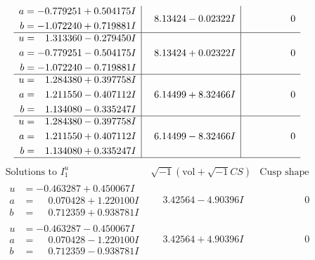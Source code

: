 \documentclass[1p]{elsarticle_modified}
\theoremstyle{definition}
\newcommand{\I}{\sqrt{-1}}
\begin{document}
$$\begin{array}{c|c|c}
\begin{aligned}
a &= -0.779251 + 0.504175 I \\
b &= -1.072240 + 0.719881 I\end{aligned}
 & \phantom{-}8.13424 - 0.02322 I & \phantom{-0.000000 } 0 \\ \hline\begin{aligned}
u &= \phantom{-}1.313360 - 0.279450 I \\
a &= -0.779251 - 0.504175 I \\
b &= -1.072240 - 0.719881 I\end{aligned}
 & \phantom{-}8.13424 + 0.02322 I & \phantom{-0.000000 } 0 \\ \hline\begin{aligned}
u &= \phantom{-}1.284380 + 0.397758 I \\
a &= \phantom{-}1.211550 - 0.407112 I \\
b &= \phantom{-}1.134080 - 0.335247 I\end{aligned}
 & \phantom{-}6.14499 + 8.32466 I & \phantom{-0.000000 } 0 \\ \hline\begin{aligned}
u &= \phantom{-}1.284380 - 0.397758 I \\
a &= \phantom{-}1.211550 + 0.407112 I \\
b &= \phantom{-}1.134080 + 0.335247 I\end{aligned}
 & \phantom{-}6.14499 - 8.32466 I & \phantom{-0.000000 } 0\\
 \hline 
 \end{array}$$\newpage$$\begin{array}{c|c|c}  
\text{Solutions to }I^u_{1}& \I (\text{vol} + \sqrt{-1}CS) & \text{Cusp shape}\\
 \hline 
\begin{aligned}
u &= -0.463287 + 0.450067 I \\
a &= \phantom{-}0.070428 + 1.220100 I \\
b &= \phantom{-}0.712359 + 0.938781 I\end{aligned}
 & \phantom{-}3.42564 - 4.90396 I & \phantom{-0.000000 } 0 \\ \hline\begin{aligned}
u &= -0.463287 - 0.450067 I \\
a &= \phantom{-}0.070428 - 1.220100 I \\
b &= \phantom{-}0.712359 - 0.938781 I\end{aligned}
 & \phantom{-}3.42564 + 4.90396 I & \phantom{-0.000000 } 0 \\ \hline\begin{aligned}

\end{aligned}
\end{array}$$
\end{document}
